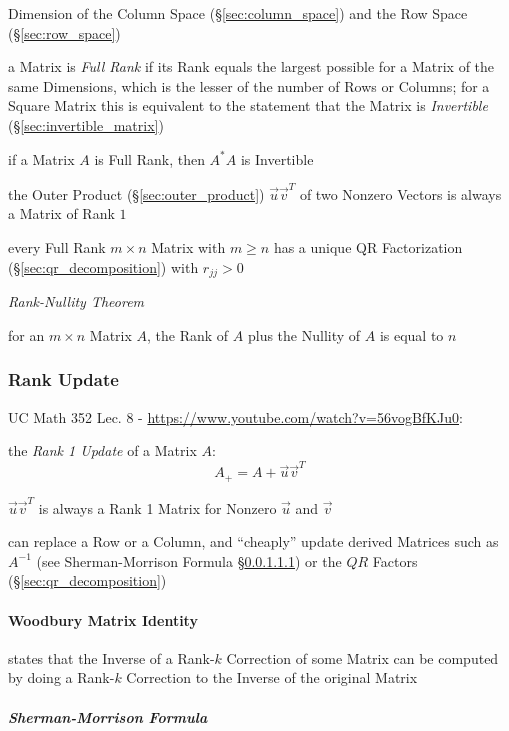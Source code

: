 Dimension of the Column Space (\S\ref{sec:column_space}) and the Row Space
(\S\ref{sec:row_space})

a Matrix is \emph{Full Rank} if its Rank equals the largest possible for a
Matrix of the same Dimensions, which is the lesser of the number of Rows or
Columns; for a Square Matrix this is equivalent to the statement that the
Matrix is \emph{Invertible} (\S\ref{sec:invertible_matrix})

if a Matrix $A$ is Full Rank, then $A^*A$ is Invertible

the Outer Product (\S\ref{sec:outer_product}) $\vec{u}\vec{v}^T$ of two Nonzero
Vectors is always a Matrix of Rank $1$

every Full Rank $m \times n$ Matrix with $m \geq n$ has a unique QR
Factorization (\S\ref{sec:qr_decomposition}) with $r_{jj} > 0$

\emph{Rank-Nullity Theorem}

for an $m \times n$ Matrix $A$, the Rank of $A$ plus the Nullity of $A$ is
equal to $n$



\subsubsection{Rank Update}\label{sec:rank_update}

UC Math 352 Lec. 8 - \url{https://www.youtube.com/watch?v=56vogBfKJu0}:

the \emph{Rank 1 Update} of a Matrix $A$:
\[
  A_+ = A + \vec{u}\vec{v}^T
\]

$\vec{u}\vec{v}^T$ is always a Rank 1 Matrix for Nonzero $\vec{u}$ and
$\vec{v}$

can replace a Row or a Column, and ``cheaply'' update derived Matrices such as
$A^{-1}$ (see Sherman-Morrison Formula \S\ref{sec:sherman_morrison}) or the
$QR$ Factors (\S\ref{sec:qr_decomposition})



\paragraph{Woodbury Matrix Identity}\label{sec:woodbury_matrix_identity}\hfill

states that the Inverse of a Rank-$k$ Correction of some Matrix can be computed
by doing a Rank-$k$ Correction to the Inverse of the original Matrix



\subparagraph{Sherman-Morrison Formula}\label{sec:sherman_morrison}\hfill

